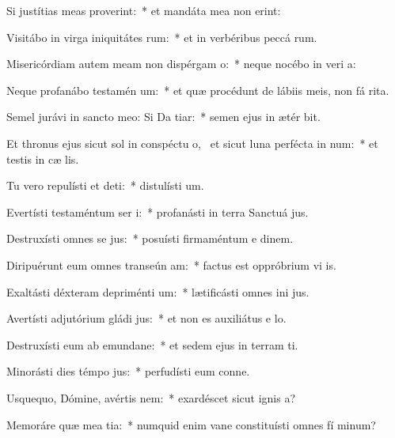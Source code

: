 \item Si justítias meas proverint:~* et mandáta mea non erint:
\item Visitábo in virga iniquitátes rum:~* et in verbéribus peccá rum.
\item Misericórdiam autem meam non dispérgam  o:~* neque nocébo in veri a:
\item Neque profanábo testamén um:~* et quæ procédunt de lábiis meis, non fá rita.
\item Semel jurávi in sancto meo: Si Da tiar:~* semen ejus in ætér bit.
\item Et thronus ejus sicut sol in conspéctu o,~\pscross{} et sicut luna perfécta in num:~* et testis in cæ lis.
\item Tu vero repulísti et deti:~* distulísti  um.
\item Evertísti testaméntum ser i:~* profanásti in terra Sanctuá jus.
\item Destruxísti omnes se jus:~* posuísti firmaméntum e dinem.
\item Diripuérunt eum omnes transeún am:~* factus est oppróbrium vi is.
\item Exaltásti déxteram depriménti um:~* lætificásti omnes ini jus.
\item Avertísti adjutórium gládi jus:~* et non es auxiliátus e  lo.
\item Destruxísti eum ab emundane:~* et sedem ejus in terram ti.
\item Minorásti dies témpo jus:~* perfudísti eum conne.
\item Usquequo, Dómine, avértis  nem:~* exardéscet sicut ignis  a?
\item Memoráre quæ mea tia:~* numquid enim vane constituísti omnes fí minum?
